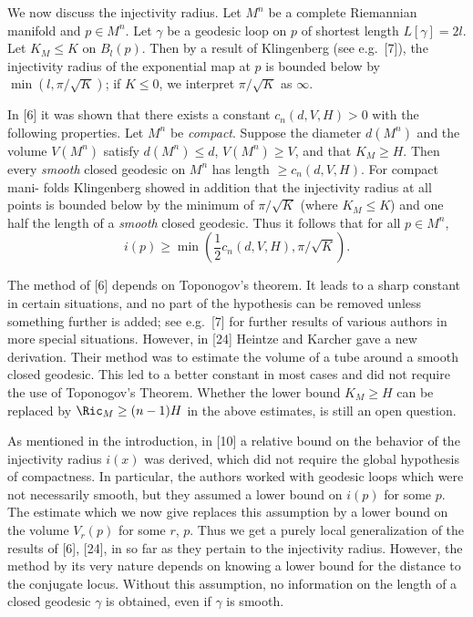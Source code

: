 We now discuss the injectivity radius. Let $M^n$ be a complete Riemannian
manifold and $p \in M^n$. Let $\gamma$ be a geodesic loop on $p$ of shortest
length $L[\gamma] = 2l$. Let $K_M \leq K$ on $B_l(p)$. Then by a result of
Klingenberg (see e.g.\ [7]), the injectivity radius of the exponential map at $p$
is bounded below by $\min(l, \pi/\sqrt{K})$; if $K \leq 0$, we interpret
$\pi/\sqrt{K}$ as $\infty$.

In [6] it was shown that there exists a constant $c_n(d, V, H) > 0$ with the
following properties. Let $M^n$ be \textit{compact}. Suppose the diameter
$d(M^n)$ and the volume $V(M^n)$ satisfy $d(M^n) \leq d$, $V(M^n) \geq V$, and
that $K_M \geq H$. Then every \textit{smooth} closed geodesic on $M^n$ has length
$\geq c_n(d, V, H)$. For compact mani- folds Klingenberg showed in addition that
the injectivity radius at all points is bounded below by the minimum of
$\pi/\sqrt{K}$ (where $K_M \leq K$) and one half the length of a \textit{smooth}
closed geodesic. Thus it follows that for all $p \in M^n$,
\begin{equation}
\tag{4.20}
i(p) \geq \min\left(\frac{1}{2} c_n(d, V, H), \pi/\sqrt{K}\right).
\end{equation}

The method of [6] depends on Toponogov's theorem. It leads to a sharp constant
in certain situations, and no part of the hypothesis can be removed unless
something further is added; see e.g.\ [7] for further results of various
authors in more special situations. However, in [24] Heintze and Karcher gave
a new derivation. Their method was to estimate the volume of a tube around a
smooth closed geodesic. This led to a better constant in most cases and did not
require the use of Toponogov's Theorem. Whether the lower bound
$K_M \geq H$ can be replaced by $\Ric_M \geq (n-1)H$ in the above estimates,
is still an open question.

As mentioned in the introduction, in [10] a relative bound on the behavior of
the injectivity radius $i(x)$ was derived, which did not require the global
hypothesis of compactness. In particular, the authors worked with geodesic
loops which were not necessarily smooth, but they assumed a lower bound on
$i(p)$ for some $p$. The estimate which we now give replaces this assumption by
a lower bound on the volume $V_r(p)$ for some $r$, $p$. Thus we get a purely
local generalization of the results of [6], [24], in so far as they pertain to
the injectivity radius. However, the method by its very nature depends on
knowing a lower bound for the distance to the conjugate locus. Without this
assumption, no information on the length of a closed geodesic $\gamma$ is
obtained, even if $\gamma$ is smooth.


